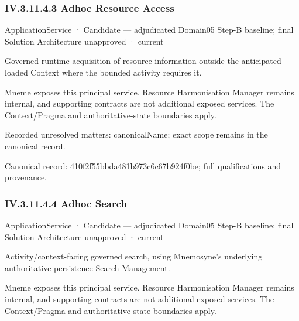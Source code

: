\subsubsection*{IV.3.11.4.3 Adhoc Resource Access}
\label{navigation:IV.3.11.4.3}

\label{element:410f2f55bbda481b973c6c67b924f0be}
{\small ApplicationService · Candidate — adjudicated Domain05 Step-B baseline; final Solution Architecture unapproved · current}\par

Governed runtime acquisition of resource information outside the anticipated loaded Context where the bounded activity requires it.



Mneme exposes this principal service. Resource Harmonisation Manager remains internal, and supporting contracts are not additional exposed services. The Context/Pragma and authoritative-state boundaries apply.


{\small Recorded unresolved matters: canonicalName; exact scope remains in the canonical record.}\par
{\footnotesize \href{../../../../../../../../continuum/application/application-service/410f2f55bbda481b973c6c67b924f0be.md}{Canonical record: 410f2f55bbda481b973c6c67b924f0be}; full qualifications and provenance.}\par
\subsubsection*{IV.3.11.4.4 Adhoc Search}
\label{navigation:IV.3.11.4.4}

\label{element:02bf54d699b44ed0b26fa5b8125f0f01}
{\small ApplicationService · Candidate — adjudicated Domain05 Step-B baseline; final Solution Architecture unapproved · current}\par

Activity/context-facing governed search, using Mnemosyne's underlying authoritative persistence Search Management.



Mneme exposes this principal service. Resource Harmonisation Manager remains internal, and supporting contracts are not additional exposed services. The Context/Pragma and authoritative-state boundaries apply.


